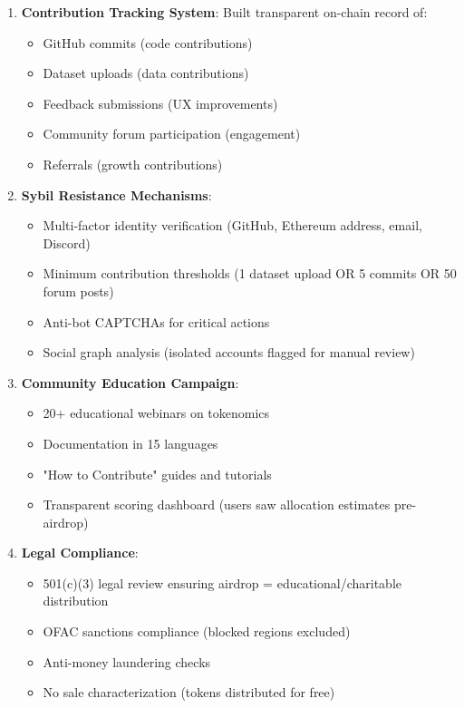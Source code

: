 \documentclass[11pt,letterpaper]{article}
\theoremstyle{definition}
\theoremstyle{remark}
\begin{document}
\begin{enumerate}
\item \textbf{Contribution Tracking System}: Built transparent on-chain record of:
    \begin{itemize}
    \item GitHub commits (code contributions)
    \item Dataset uploads (data contributions)
    \item Feedback submissions (UX improvements)
    \item Community forum participation (engagement)
    \item Referrals (growth contributions)
    \end{itemize}

\item \textbf{Sybil Resistance Mechanisms}:
    \begin{itemize}
    \item Multi-factor identity verification (GitHub, Ethereum address, email, Discord)
    \item Minimum contribution thresholds (1 dataset upload OR 5 commits OR 50 forum posts)
    \item Anti-bot CAPTCHAs for critical actions
    \item Social graph analysis (isolated accounts flagged for manual review)
    \end{itemize}

\item \textbf{Community Education Campaign}:
    \begin{itemize}
    \item 20+ educational webinars on tokenomics
    \item Documentation in 15 languages
    \item "How to Contribute" guides and tutorials
    \item Transparent scoring dashboard (users saw allocation estimates pre-airdrop)
    \end{itemize}

\item \textbf{Legal Compliance}:
    \begin{itemize}
    \item 501(c)(3) legal review ensuring airdrop = educational/charitable distribution
    \item OFAC sanctions compliance (blocked regions excluded)
    \item Anti-money laundering checks
    \item No sale characterization (tokens distributed for free)
    \end{itemize}
\end{enumerate}
\end{document}

